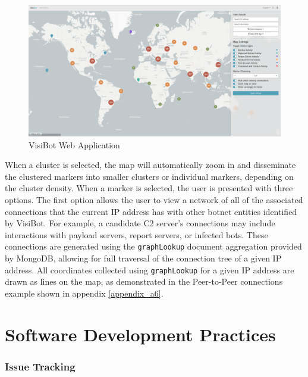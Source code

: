 \begin{figure}[!htb]
    \centering
    \includegraphics[width=1.0\linewidth]{images/visibot_screenshot_cluster.png}
    \caption{VisiBot Web Application}
    \label{fig:visibot_screenshot_cluster} 
\end{figure}

When a cluster is selected, the map will automatically zoom in and disseminate the clustered markers into smaller clusters or individual markers, depending on the cluster density. When a marker is selected, the user is presented with three options. The first option allows the user to view a network of all of the associated connections that the current IP address has with other botnet entities identified by VisiBot. For example, a candidate C2 server's connections may include interactions with payload servers, report servers, or infected bots. These connections are generated using the \texttt{graphLookup} document aggregation \citep{graphLookup} provided by MongoDB, allowing for full traversal of the connection tree of a given IP address. All coordinates collected using \texttt{graphLookup} for a given IP address are drawn as lines on the map, as demonstrated in the Peer-to-Peer connections example shown in appendix \ref{appendix_a6}.




\section{Software Development Practices}

\subsubsection{Issue Tracking}

